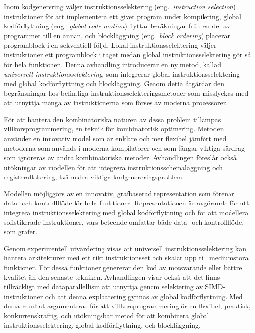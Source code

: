%

\begin{sammanfattning}
  Inom kodgenerering v\"aljer instruktionsselektering (eng.\ \emph{instruction
    selection}) instruktioner f\"or att implementera ett givet program under
  kompilering, global kodf\"orflyttning (eng.\ \emph{global code motion})
  flyttar ber\"akningar fr\r{a}n en del av programmet till en annan, och
  blockl\"aggning (eng.\ \emph{block ordering}) placerar programblock i en
  sekventiell f\"oljd.
  Lokal instruktionsselektering v\"aljer instruktioner ett programblock i taget
  medan global instruktionsselektering g\"or s\r{a} f\"or hela funktionen.
  Denna avhandling introducerar en ny metod, kallad \emph{universell
    instruktionsselektering}, som integrerar global instruktionsselektering med
  global kodf\"orflyttning och blockl\"aggning.
  Genom detta \r{a}tg\"ardar den begr\"ansningar hos befintliga
  instruktionsselekteringsmetoder som misslyckas med att utnyttja m\r{a}nga av
  instruktionerna som f\"orses av moderna processorer.

  F\"or att hantera den kombinatoriska naturen av dessa problem till\"ampas
  villkorsprogrammering, en teknik f\"or kombinatorisk optimering.
  Metoden anv\"ander en innovativ model som \"ar enklare och mer flexibel
  j\"amf\"ort med metoderna som anv\"ands i moderna kompilatorer och som
  f\r{a}ngar viktiga s\"ardrag som ignoreras av andra kombinatoriska metoder.
  Avhandlingen f\"oresl\r{a}r ocks\r{a} ut\"okningar av modellen f\"or att
  integrera instruktionsschemal\"aggning och registerallokering, tv\r{a} andra
  viktiga kodgenereringsproblem.

  Modellen m\"ojligg\"ors av en innovativ, grafbaserad representation som
  f\"orenar data- och kontrollfl\"ode f\"or hela funktioner.
  Representationen \"ar avg\"orande f\"or att integrera instruktionsselektering
  med global kodf\"orflyttning och f\"or att modellera sofistikerade
  instruktioner, vars beteende omfattar b\r{a}de data- och kontrollfl\"ode, som
  grafer.

  Genom experimentell utv\"ardering visas att universell instruktionsselektering
  kan hantera arkitekturer med ett rikt instruktionsset och skalar upp till
  mediumstora funktioner.
  F\"or dessa funktioner genererar den kod av motsvarande eller b\"attre
  kvalitet \"an den senaste tekniken.
  Avhandlingen visar ocks\r{a} att det finns tillr\"ackligt med dataparallellism
  att utnyttja genom selektering av SIMD-instruktioner och att denna
  exploatering gynnas av global kodf\"orflyttning.
  Med dessa resultat argumenteras f\"or att villkorsprogrammering \"ar en
  flexibel, praktisk, konkurrenskraftig, och ut\"okningsbar metod f\"or att
  kombinera global instruktionsselektering, global kodf\"orflyttning, och
  blockl\"aggning.
\end{sammanfattning}
